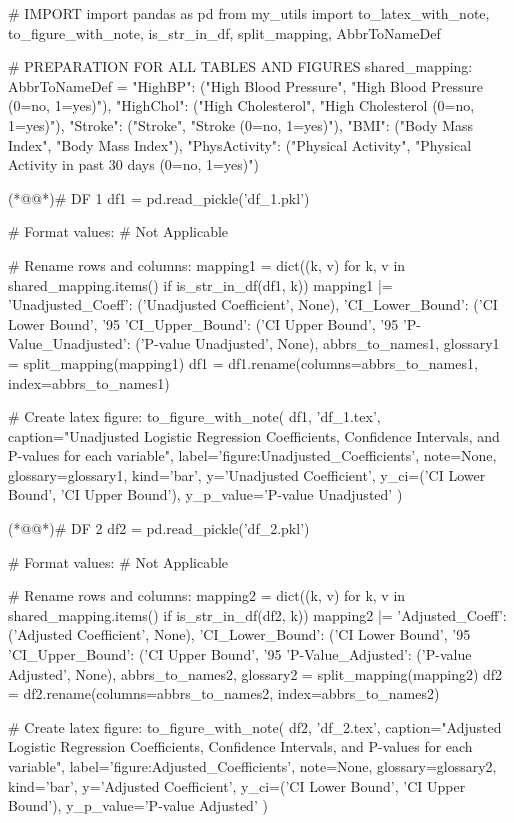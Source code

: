 \documentclass[11pt]{article}
\begin{document}
\begin{python}

# IMPORT
import pandas as pd
from my_utils import to_latex_with_note, to_figure_with_note, is_str_in_df, split_mapping, AbbrToNameDef

# PREPARATION FOR ALL TABLES AND FIGURES
shared_mapping: AbbrToNameDef = {
    "HighBP": ("High Blood Pressure", "High Blood Pressure (0=no, 1=yes)"),
    "HighChol": ("High Cholesterol", "High Cholesterol (0=no, 1=yes)"),
    "Stroke": ("Stroke", "Stroke (0=no, 1=yes)"),
    "BMI": ("Body Mass Index", "Body Mass Index"),
    "PhysActivity": ("Physical Activity", "Physical Activity in past 30 days (0=no, 1=yes)")
}

(*@@*)# DF 1
df1 = pd.read_pickle('df_1.pkl')

# Format values:
# Not Applicable

# Rename rows and columns:
mapping1 = dict((k, v) for k, v in shared_mapping.items() if is_str_in_df(df1, k)) 
mapping1 |= {
    'Unadjusted_Coeff': ('Unadjusted Coefficient', None),
    'CI_Lower_Bound':   ('CI Lower Bound', '95%
    'CI_Upper_Bound':   ('CI Upper Bound', '95%
    'P-Value_Unadjusted': ('P-value Unadjusted', None),
}
abbrs_to_names1, glossary1 = split_mapping(mapping1)
df1 = df1.rename(columns=abbrs_to_names1, index=abbrs_to_names1)

# Create latex figure:
to_figure_with_note(
    df1, 'df_1.tex',
    caption="Unadjusted Logistic Regression Coefficients, Confidence Intervals, and P-values for each variable", 
    label='figure:Unadjusted_Coefficients',
    note=None,
    glossary=glossary1,
    kind='bar',
    y='Unadjusted Coefficient',
    y_ci=('CI Lower Bound', 'CI Upper Bound'), 
    y_p_value='P-value Unadjusted'
)

(*@@*)# DF 2
df2 = pd.read_pickle('df_2.pkl')

# Format values:
# Not Applicable

# Rename rows and columns:
mapping2 = dict((k, v) for k, v in shared_mapping.items() if is_str_in_df(df2, k)) 
mapping2 |= {
    'Adjusted_Coeff': ('Adjusted Coefficient', None),
    'CI_Lower_Bound':   ('CI Lower Bound', '95%
    'CI_Upper_Bound':   ('CI Upper Bound', '95%
    'P-Value_Adjusted': ('P-value Adjusted', None),
}
abbrs_to_names2, glossary2 = split_mapping(mapping2)
df2 = df2.rename(columns=abbrs_to_names2, index=abbrs_to_names2)

# Create latex figure:
to_figure_with_note(
    df2, 'df_2.tex',
    caption="Adjusted Logistic Regression Coefficients, Confidence Intervals, and P-values for each variable", 
    label='figure:Adjusted_Coefficients',
    note=None,
    glossary=glossary2,
    kind='bar',
    y='Adjusted Coefficient',
    y_ci=('CI Lower Bound', 'CI Upper Bound'), 
    y_p_value='P-value Adjusted'
)

\end{python}
\end{document}
